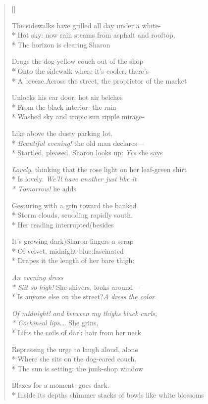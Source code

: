 \label{ch:sunset_on_market_street}
\settowidth{\versewidth}{Inside its depths shimmer stacks of bowls like white blossoms}
\begin{verse}[\versewidth]

The sidewalks have grilled all day under a white-\\*
Hot sky: now rain steams from asphalt and rooftop,\\*
The horizon is clearing.\qquad \qquad Sharon

Drags the dog-yellow couch out of the shop\\*
Onto the sidewalk where it's cooler, there's\\*
A breeze.\qquad Across the street, the proprietor of the market

Unlocks his car door: hot air belches\\*
From the black interior: the rain-\\*
Washed sky and tropic sun ripple mirage-

Like above the dusty parking lot.\\*
\textit{Beautiful evening!} the old man declares---\\*
Startled, pleased, Sharon looks up: \textit{Yes} she says

\textit{Lovely},  thinking that the rose light on her leaf-green shirt\\*
Is lovely. \textit{We'll have another just like it\\*
Tomorrow!} he adds

Gesturing with a grin toward the banked\\*
Storm clouds, scudding rapidly south.\\*
Her reading interrupted\qquad (besides

It's growing dark)\quad Sharon fingers a scrap\\*
Of velvet, midnight-blue:\quad fascinated\\*
Drapes it the length of her bare thigh:

\textit{An evening dress\\*
Slit so high!} She shivers, looks around---\\*
Is anyone else on the street?\quad \textit{A dress the color}

\textit{Of midnight!  and between my thighs black curls,\\*
Cochineal lips}\ldots . She grins,\\*
Lifts the coils of dark hair from her neck


Repressing the urge to laugh aloud, alone\\*
Where she sits on the dog-eared couch.\\*
The sun is setting: the junk-shop window

Blazes for a moment: goes dark.\\*
Inside its depths shimmer stacks of bowls like white blossoms
\end{verse}
